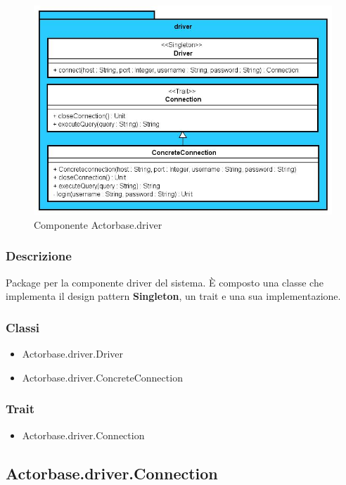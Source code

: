 \documentclass[a4paper]{article}
\begin{document}
			\begin{figure}[H]
				\centering
				\includegraphics[width=\textwidth]{ST/Driver/driverLevel.jpg}
				\caption{Componente Actorbase.driver}
			\end{figure}
			\subsubsection{Descrizione}
				Package per la componente driver del sistema. 
				È composto una classe che implementa il design pattern \textbf{Singleton}, un trait e una sua implementazione.
				
			\subsubsection{Classi}
				\begin{itemize}
					\item Actorbase.driver.Driver
					\item Actorbase.driver.ConcreteConnection
				\end{itemize}
			
			\subsubsection{Trait}
				\begin{itemize}
					\item Actorbase.driver.Connection
				\end{itemize}
					
		\subsection{Actorbase.driver.Connection}
\end{document}
